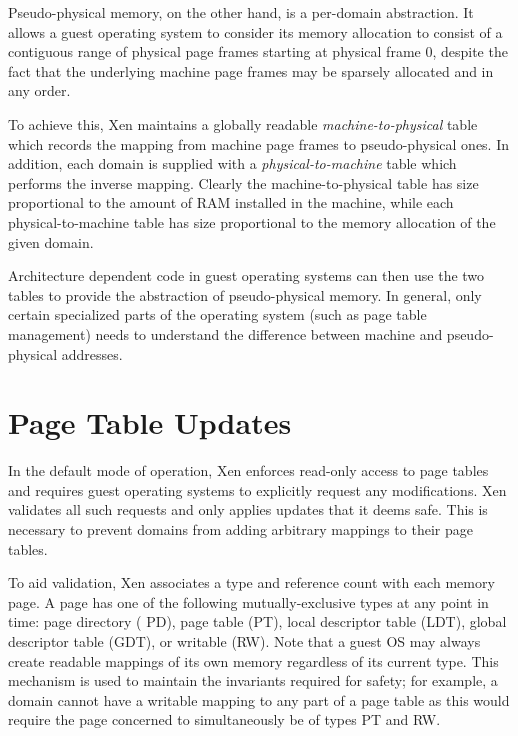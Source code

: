 \documentclass[11pt,twoside,final,openright]{xenstyle}
\begin{document}
Pseudo-physical memory, on the other hand, is a per-domain
abstraction. It allows a guest operating system to consider its memory
allocation to consist of a contiguous range of physical page frames
starting at physical frame 0, despite the fact that the underlying
machine page frames may be sparsely allocated and in any order.

To achieve this, Xen maintains a globally readable {\it
machine-to-physical} table which records the mapping from machine page
frames to pseudo-physical ones. In addition, each domain is supplied
with a {\it physical-to-machine} table which performs the inverse
mapping. Clearly the machine-to-physical table has size proportional
to the amount of RAM installed in the machine, while each
physical-to-machine table has size proportional to the memory
allocation of the given domain.

Architecture dependent code in guest operating systems can then use
the two tables to provide the abstraction of pseudo-physical
memory. In general, only certain specialized parts of the operating
system (such as page table management) needs to understand the
difference between machine and pseudo-physical addresses.

\section{Page Table Updates}

In the default mode of operation, Xen enforces read-only access to
page tables and requires guest operating systems to explicitly request
any modifications.  Xen validates all such requests and only applies
updates that it deems safe.  This is necessary to prevent domains from
adding arbitrary mappings to their page tables.

To aid validation, Xen associates a type and reference count with each
memory page. A page has one of the following
mutually-exclusive types at any point in time: page directory ({\sf
PD}), page table ({\sf PT}), local descriptor table ({\sf LDT}),
global descriptor table ({\sf GDT}), or writable ({\sf RW}). Note that
a guest OS may always create readable mappings of its own memory 
regardless of its current type. 
This mechanism is used to
maintain the invariants required for safety; for example, a domain
cannot have a writable mapping to any part of a page table as this
would require the page concerned to simultaneously be of types {\sf
  PT} and {\sf RW}.
\end{document}
